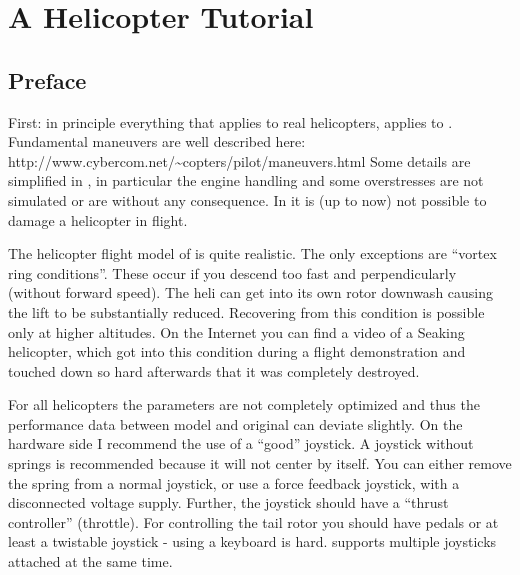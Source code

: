 
\fi

\iffalse
\chapter{A Helicopter Tutorial}
\label{helicopter}

\section{Preface}
 
First: in principle everything that applies to real helicopters, applies 
to \FlightGear. Fundamental maneuvers are well described here:\\ 
{http://www.cybercom.net/\~{}copters/pilot/maneuvers.html} Some details are 
simplified in \FlightGear, in particular the engine handling and some 
overstresses are not simulated or are without any consequence. 
In \FlightGear{} it is (up to now) not possible to damage a helicopter in 
flight. 


The helicopter flight model of \FlightGear{} is 
quite realistic. The only exceptions are ``vortex ring conditions''. 
These occur if you descend too fast and perpendicularly 
(without forward speed). The heli can get into its own rotor downwash 
causing the lift to be substantially reduced. Recovering from this condition 
is possible only at higher altitudes. On the Internet you can find a video 
of a Seaking helicopter, which got into this condition during a flight 
demonstration and touched down so hard afterwards that it was completely 
destroyed. 

For all \FlightGear{} helicopters the parameters are not completely optimized 
and thus the performance data between model and original can deviate slightly. 
On the hardware side I recommend the use of a ``good'' joystick. A joystick 
without springs is recommended because it will not center by itself. You 
can either remove the spring from a normal joystick, or use a force feedback 
joystick, with a disconnected voltage supply. Further, the joystick should 
have a ``thrust controller'' (throttle). For controlling the tail rotor you 
should have pedals or at least a twistable joystick - using a keyboard is hard.
\FlightGear{} supports multiple joysticks attached at the same time. 

